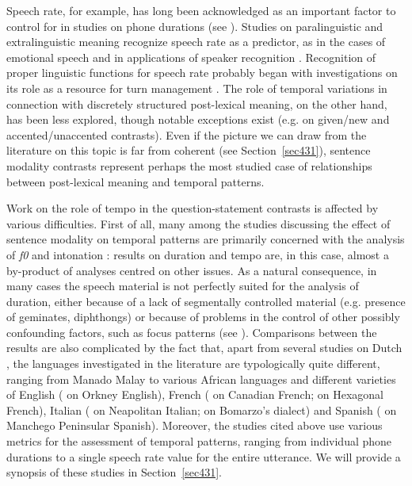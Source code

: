 Speech rate, for example, has long been acknowledged as an important factor to control for in studies on phone durations (see \citealt{turk2006acoustic}). Studies on paralinguistic and extralinguistic meaning recognize speech rate as a predictor, as in the cases of emotional speech \citep{williams1972emotions} and in applications of speaker recognition \citep{vanheerden2007speech}. Recognition of proper linguistic functions for speech rate probably began with investigations on its role as a resource for turn management \citep{duncan1972signals}. The role of temporal variations in connection with discretely structured post-lexical meaning, on the other hand, has been less explored, though notable exceptions exist (e.g. \citealt{eefting1991effect} on given/new and accented/unaccented contrasts). Even if the picture we can draw from the literature on this topic is far from coherent (see Section~\ref{sec431}), sentence modality contrasts represent perhaps the most studied case of relationships between post-lexical meaning and temporal patterns.

Work on the role of tempo in the question-statement contrasts is affected by various difficulties. First of all, many among the studies discussing the effect of sentence modality on temporal patterns are primarily concerned with the analysis of \textit{f0} and intonation \citep{maturi1988intonazione,ryalls1994effects,smith2002prosodic,rialland2007question,petrone2008role}: results on duration and tempo are, in this case, almost a by-product of analyses centred on other issues. As a natural consequence, in many cases the speech material is not perfectly suited for the analysis of duration, either because of a lack of segmentally controlled material  (e.g. presence of geminates, diphthongs) or because of problems in the control of other possibly confounding factors, such as focus patterns (see \citealt{gubian2011joint}). Comparisons between the results are also complicated by the fact that, apart from several studies on Dutch \citep{vanheuven2000phonetic,vanheuven2002temporal,vanheuven2005speech}, the languages investigated in the literature are typologically quite different, ranging from Manado Malay \citep{vanheuven2005speech} to various African languages \citep{rialland2007question} and different varieties of English (\citealt{vanheuven2005speech} on Orkney English), French (\citealt{ryalls1994effects} on Canadian French; \citealt{smith2002prosodic} on Hexagonal French), Italian (\citealt{maturi1988intonazione,petrone2008role} on Neapolitan Italian; \citealt{dedominicis2010interrogative} on Bomarzo’s dialect) and Spanish (\citealt{henriksen2012intonation} on Manchego Peninsular Spanish). Moreover, the studies cited above use various metrics for the assessment of temporal patterns, ranging from individual phone durations to a single speech rate value for the entire utterance. We will provide a synopsis of these studies in Section~\ref{sec431}.

